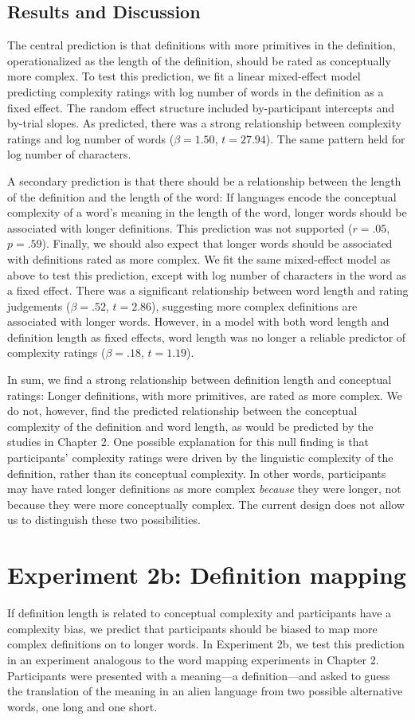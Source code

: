 \subsection{Results and Discussion}
The central prediction is that definitions with more primitives in the definition, operationalized as the length of the definition, should be rated as conceptually more complex. To test this prediction, we fit a linear mixed-effect model predicting complexity ratings with log number of words in the definition as a fixed effect. The random effect structure included by-participant intercepts and by-trial slopes. As predicted, there was a strong relationship between complexity ratings and log number of words ($\beta=1.50$, $t =27.94$). The same pattern held for log number of characters.

A secondary prediction is that there should be a relationship between the length of the definition and the length of the word: If languages encode the conceptual complexity of a word's meaning in the length of the word, longer words should be associated with longer definitions. This prediction was not supported ($r=.05$, $p =.59$). Finally, we should also expect that  longer words should be associated with definitions rated as more complex. We fit the same mixed-effect model as above to test this prediction, except with log number of characters in the word as a fixed effect. There was a significant relationship between word length and rating judgements ($\beta=.52$, $t =2.86$), suggesting more complex definitions are associated with longer words. However, in a model with both word length and definition length as fixed effects, word length was no longer a reliable predictor of complexity ratings ($\beta=.18$, $t =1.19$).

In sum, we find a strong relationship between definition length and conceptual ratings: Longer definitions, with more primitives, are rated as more complex. We do not, however, find the predicted relationship between the conceptual complexity of the definition and word length, as would be predicted by the studies in Chapter 2.  One possible explanation for this null finding is that participants' complexity ratings were driven by the linguistic complexity of the definition, rather than its conceptual complexity. In other words, participants may have  rated longer definitions as more complex {\it because} they were longer, not because they were more conceptually complex. The current design does not allow us to distinguish these two possibilities.

\section{Experiment 2b: Definition mapping}
If definition length is related to conceptual complexity and participants have a complexity bias, we predict that participants should be biased to map more complex definitions on to longer words. In Experiment 2b, we test this prediction in an experiment analogous to the word mapping experiments in Chapter 2. Participants were presented with a meaning---a definition---and asked to guess the translation of the meaning in an alien language from two possible alternative words, one long and one short. 

